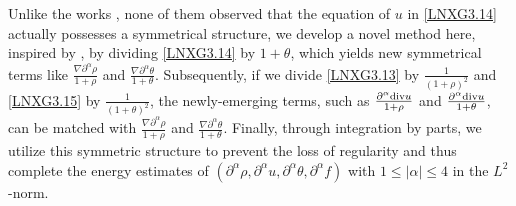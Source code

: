\documentclass[reqno,11pt]{amsart}
\theoremstyle{plain}
\numberwithin{equation}{section}
\begin{document}
Unlike the works   \cite{LNW-arXiv-2025,Mu-Wang-20}, none of them  
 observed that the equation of $u$ in \eqref{LNXG3.14} actually possesses 
 a symmetrical structure,   we develop a 
 novel method here,  inspired by \cite{At-ARMA-2006, JJLX-2014}, by dividing \eqref{LNXG3.14} by $1+\theta$, which 
 yields new symmetrical terms like
  $\frac{\nabla\partial^\alpha \rho}{1+\rho}$ and $\frac{\nabla\partial^\alpha 
  \theta}{1+\theta}$. Subsequently, 
  if we divide \eqref{LNXG3.13} by $\frac{1}{(1+\rho)^2}$ and \eqref{LNXG3.15} 
  by $\frac{1}{(1+\theta)^2}$, the newly-emerging terms, 
  such as $\frac{\partial^\alpha{\rm div}u}{1+\rho}$ and
   $\frac{\partial^\alpha{\rm div}u}{1+\theta}$,
    can be matched with $\frac{\nabla\partial^\alpha \rho}{1+\rho}$ 
    and $\frac{\nabla\partial^\alpha \theta}{1+\theta}$. 
    Finally, through integration by parts, we 
     utilize this symmetric structure to prevent the loss
      of regularity and thus complete the energy estimates of  
       $(\partial^\alpha\rho,\partial^\alpha u,\partial^\alpha\theta,\partial^\alpha f)$ 
       with $1\leq|\alpha|\leq 4$ in the $L^2$-norm. 
\end{document}
